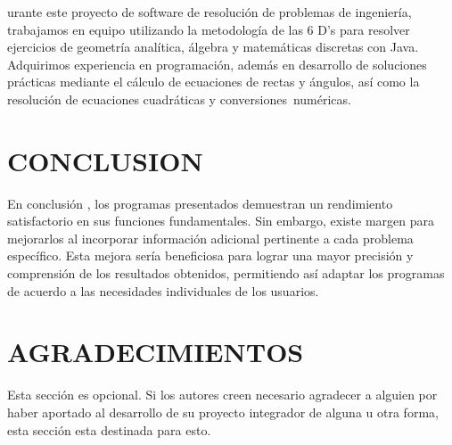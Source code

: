 \documentclass{IEEEcsmag}
\begin{document}
\maketitle
{}urante este proyecto de software de resolución de problemas de ingeniería, trabajamos en equipo utilizando la metodología de las 6 D's para resolver ejercicios de geometría analítica, álgebra y matemáticas discretas con Java. Adquirimos experiencia en programación, además en desarrollo de soluciones prácticas mediante el cálculo de ecuaciones de rectas y ángulos, así como la resolución de ecuaciones cuadráticas y conversiones numéricas.

\clearpage


\clearpage


\clearpage


\clearpage


\clearpage


\clearpage


\clearpage


\section{CONCLUSION}
En conclusión , los programas presentados demuestran un rendimiento satisfactorio en sus funciones fundamentales. Sin embargo, existe margen para mejorarlos al incorporar información adicional pertinente a cada problema específico. Esta mejora sería beneficiosa para lograr una mayor precisión y comprensión de los resultados obtenidos, permitiendo así adaptar los programas de acuerdo a las necesidades individuales de los usuarios.
\vspace*{-8pt}


\section{AGRADECIMIENTOS}
Esta sección es opcional. Si los autores creen necesario agradecer a alguien por haber aportado al desarrollo de su proyecto integrador de alguna u otra forma, esta sección esta destinada para esto.


\def\refname{REFERENCES}
\end{document}
